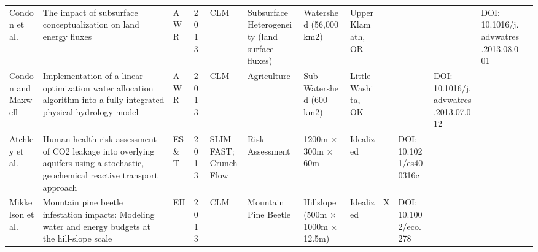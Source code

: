 {{\begin{tabular}{ p{1cm} p{2cm} p{0.75cm} p{0.5cm} p{1cm} p{1.5cm} p{1cm} p{1cm} p{0.25cm} p{0.25cm} p{0.25cm} p{0.25cm} p{1cm} }
Condon et al. & The impact of subsurface conceptualization on land energy fluxes & AWR & 2013 & CLM & Subsurface Heterogeneity (land surface fluxes) & Watershed (56,000 km2) & Upper Klamath, OR &  &  &  & DOI: 10.1016/j.advwatres.2013.08.001  \\
Condon and Maxwell & Implementation of a linear optimization water allocation algorithm into a fully integrated physical hydrology model & AWR & 2013 & CLM & Agriculture & Sub-Watershed (600 km2) & Little Washita, OK &  &  & DOI: 10.1016/j.advwatres.2013.07.012   \\
Atchley et al. & Human health risk assessment of CO2 leakage into overlying aquifers using a stochastic, geochemical reactive transport approach & ES\&T & 2013 & SLIM-FAST; CrunchFlow & Risk Assessment & 1200m × 300m × 60m & Idealized &  & DOI: 10.1021/es400316c   \\
Mikkelson et al. & Mountain pine beetle infestation impacts: Modeling water and energy budgets at the hill-slope scale & EH & 2013 & CLM & Mountain Pine Beetle & Hillslope (500m × 1000m × 12.5m) & Idealized & X & DOI: 10.1002/eco.278  \\
\end{tabular}

}}
